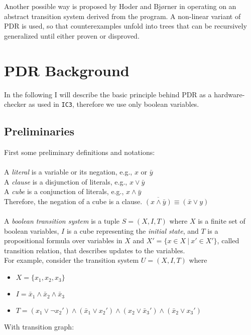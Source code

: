 \documentclass[11pt, a4paper, BCOR=10mm, ngerman, oneside]{scrbook}
\begin{document}
Another possible way is proposed by Hoder and Bjørner in \cite{GeneralizedIc3} operating on an abstract transition system derived from the program. A non-linear variant of PDR is used, so that counterexamples unfold into trees that can be recursively generalized until either proven or disproved.







\chapter{PDR Background}
\label{PDR}
In the following I will describe the basic principle behind PDR as a hardware-checker as used in \texttt{IC3}, therefore we use only boolean variables.

\section{Preliminaries}
First some preliminary definitions and notations: \\ \\
A \textsl{literal} is a variable or its negation, e.g., $x \text{ or } \bar y$ \\
A \textsl{clause} is a disjunction of literals, e.g., $x \lor \bar y$ \\
A \textsl{cube} is a conjunction of literals, e.g.,  $x \land \bar y$ \\
Therefore, the negation of a cube is a clause. $\overline{(x \land \bar y)} \equiv (\bar x \lor y)$ \\ \\

A \textsl{boolean transition system} is a tuple $S = (X, I, T)$ where $X$ is a finite set of boolean variables, $I$ is a cube representing the \textsl{initial state}, and $T$ is a propositional formula over variables in $X$ and $X' = \{x \in X \ | \ x' \in X'\}$, called transition relation, that describes updates to the variables.
\\

For example, consider the transition system $U = (X, I, T)$ where
\begin{itemize}
\item $ X= \{x_1, x_2, x_3\}$
\item $I = \bar x_1 \land \bar x_2 \land \bar x_3$
\item $T = (x_1 \lor \neg x_2' ) \land ( \bar x_1 \lor x_2') \land (x_2 \lor \bar x_3') \land ( \bar x_2 \lor x_3')$
\end{itemize}
With transition graph:
\end{document}
